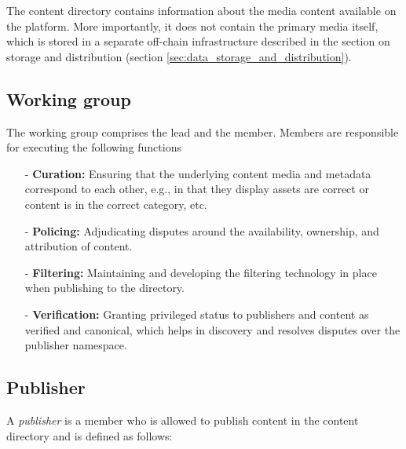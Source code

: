 \documentclass{article}
\begin{document}
The content directory contains information about the media content available on the platform. More importantly, it does not contain the primary media itself, which is stored in a separate off-chain infrastructure described in the section on storage and distribution (section \ref{sec:data_storage_and_distribution}).

\subsection{Working group}

The working group comprises the lead and the member. Members are responsible for executing the following functions

\begin{itemize}

    \item[-] \textbf{Curation:} Ensuring that the underlying content media and metadata correspond to each other, e.g., in that they display assets are correct or content is in the correct category, etc.

    \item[-] \textbf{Policing:} Adjudicating disputes around the availability, ownership, and attribution of content.

    \item[-] \textbf{Filtering:} Maintaining and developing the filtering technology in place when publishing to the directory.

    \item[-] \textbf{Verification:} Granting privileged status to publishers and content as verified and canonical, which helps in discovery and resolves disputes over the publisher namespace.

\end{itemize}

\subsection{Publisher}

A \textit{publisher} is a member who is allowed to publish content in the content directory and is defined as follows: \\
\end{document}
